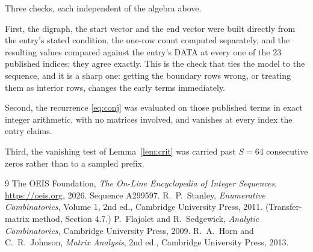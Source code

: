 \documentclass[11pt,a4paper]{article}
\theoremstyle{plain}
\theoremstyle{definition}
\begin{document}
Three checks, each independent of the algebra above.

First, the digraph, the start vector and the end vector were built directly from the
entry's stated condition, the one-row count computed separately, and the resulting values
compared against the entry's DATA at every one of the $23$ published indices; they
agree exactly. This is the check that ties the model to the sequence, and it is a sharp one:
getting the boundary rows wrong, or treating them as interior rows, changes the early terms
immediately.

Second, the recurrence \eqref{eq:conj} was evaluated on those published terms in exact
integer arithmetic, with no matrices involved, and vanishes at every index the entry claims.

Third, the vanishing test of Lemma~\ref{lem:crit} was carried past $S=64$ consecutive
zeros rather than to a sampled prefix.

\begin{thebibliography}{9}
 The OEIS Foundation, \emph{The On-Line Encyclopedia of Integer
Sequences}, \url{https://oeis.org}, 2026. Sequence A299597.
 R.~P.~Stanley, \emph{Enumerative Combinatorics}, Volume 1, 2nd ed.,
Cambridge University Press, 2011. (Transfer-matrix method, Section 4.7.)
 P.~Flajolet and R.~Sedgewick, \emph{Analytic Combinatorics}, Cambridge
University Press, 2009.
 R.~A.~Horn and C.~R.~Johnson, \emph{Matrix Analysis}, 2nd ed., Cambridge
University Press, 2013.
\end{thebibliography}
\end{document}
